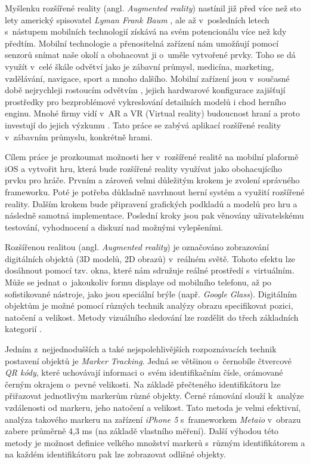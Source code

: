 \documentclass[twoside,12pt]{article}
\begin{document}
% 
Myšlenku rozšířené reality (angl. \textit{Augmented reality}) nastínil již před více než sto lety americký spisovatel \textit{Lyman Frank Baum} \cite{baum}, ale až v~posledních letech s~nástupem mobilních technologií získává na svém potencionálu více než kdy předtím. Mobilní technologie a přenositelná zařízení nám umožňují pomocí senzorů snímat naše okolí a obohacovat ji o~uměle vytvořené prvky. Toho se dá využít v~celé škále odvětví jako je zábavní průmysl, medicína, marketing, vzdělávání, navigace, sport a mnoho dalšího. Mobilní zařízení jsou v~současné době nejrychleji rostoucím odvětvím \cite{mobile_economy}, jejich hardwarové konfigurace zajišťují prostředky pro bezproblémové vykreslování detailních modelů i chod herního enginu. Mnohé firmy vidí v~AR a VR (Virtual reality) budoucnost hraní a proto investují do jejich výzkumu \cite{guardian_samsung}. Tato práce se zabývá aplikací rozšířené reality v~zábavním průmyslu, konkrétně hrami. 

% 
Cílem práce je prozkoumat možnosti her v~rozšířené realitě na mobilní plaformě iOS a vytvořit hru, která bude rozšířené reality využívat jako obohacujícího prvku pro hráče. Prvním a zároveň velmi důležitým krokem je zvolení správného frameworku. Poté je potřeba důkladně navrhnout herní systém a využití rozšířené reality. Dalším krokem bude připravení grafických podkladů a modelů pro hru a následně samotná implementace. Poslední kroky jsou pak věnovány uživatelskému testování, vyhodnocení a diskuzí nad možnými vylepšeními.

%
%

Rozšířenou realitou (angl. \textit{Augmented reality}) je označováno zobrazování digitálních objektů (3D modelů, 2D obrazů) v~reálném světě. Tohoto efektu lze dosáhnout pomocí tzv. okna, které nám sdružuje reálné prostředí s~virtuálním. Může se jednat o~jakoukoliv formu displaye od mobilního telefonu, až po sofistikované nástroje, jako jsou speciální brýle (např. \textit{Google Glass}). Digitálním objektům je možné pomocí různých technik analýzy obrazu specifikovat pozici, natočení a velikost. Metody vizuálního sledování lze rozdělit do třech základních kategorií \cite{klein_visual_tracking}.

Jedním z~nejjednodušších a také nejspolehlivějších rozpoznávacích technik postavení objektů je \textit{Marker Tracking}. Jedná se většinou o~černobíle čtvercové \textit{QR kódy}, které uchovávají informaci o~svém identifikačním čísle, orámované černým okrajem o~pevné velikosti. Na základě přečteného identifikátoru lze přiřazovat jednotlivým markerům různé objekty. Černé rámování slouží k~analýze vzdálenosti od markeru, jeho natočení a velikost. Tato metoda je velmi efektivní, analýza takového markeru na zařízení \textit{iPhone 5} s~frameworkem \textit{Metaio} v~obrazu zabere průměrně 4,3 ms (na základě vlastního měření). Další výhodou této metody je možnost definice velkého množství markerů s~různým identifikátorem a na každém identifikátoru pak lze zobrazovat odlišné objekty.
\end{document}
